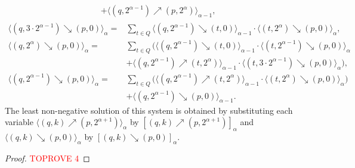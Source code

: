 \documentclass[a4paper,UKenglish,cleveref,autoref,thm-restate,colorlinks]{lipics-v2021}
\newcommand{\ocStateSpace}{Q}
\newcommand{\ocState}{q}
\newcommand{\ocStateB}{p}
\newcommand{\ocStateC}{t}
\newcommand{\ocCount}{k}
\newcommand{\powerIndex}{\alpha}
\newcommand{\upProba}[5]{[(#1,#2)\nearrow{}(#3,#4)]_{#5}}
\newcommand{\downProba}[5]{[(#1,#2)\searrow{}(#3,#4)]_{#5}}
\newcommand{\upProbaVar}[5]{\langle (#1,#2)\nearrow{}(#3,#4)\rangle_{#5}}
\newcommand{\downProbaVar}[5]{\langle (#1,#2)\searrow{}(#3,#4)\rangle_{#5}}
\begin{document}
\begin{theorem}
\begin{align}
\begin{split}
      &
      + \upProbaVar{\ocState}{2^{\powerIndex-1}}{\ocStateB}{2^{\powerIndex}}{\powerIndex-1},
    \end{split}\label{equation:transitions:up:third}
  \end{align}
  \begin{align*}
    \downProbaVar{\ocState}{3\cdot 2^{\powerIndex-1}}{\ocStateB}{0}{\powerIndex} =
    & 
      \sum_{\ocStateC\in\ocStateSpace}
      \downProbaVar{\ocState}{2^{\powerIndex-1}}{\ocStateC}{0}{\powerIndex-1}
      \cdot
      \downProbaVar{\ocStateC}{2^{\powerIndex}}{\ocStateB}{0}{\powerIndex}, \\
    \downProbaVar{\ocState}{2^{\powerIndex}}{\ocStateB}{0}{\powerIndex} =
    &
      \sum_{\ocStateC\in\ocStateSpace}\bigg(
      \downProbaVar{\ocState}{2^{\powerIndex-1}}{\ocStateC}{0}{\powerIndex-1}
      \cdot 
      \downProbaVar{\ocStateC}{2^{\powerIndex-1}}{\ocStateB}{0}{\powerIndex} \\
    &
      +
      \upProbaVar{\ocState}{2^{\powerIndex-1}}{\ocStateC}{2^{\powerIndex}}{\powerIndex-1}
      \cdot 
      \downProbaVar{\ocStateC}{3\cdot 2^{\powerIndex-1}}{\ocStateB}{0}{\powerIndex}
      \bigg), \\
    \downProbaVar{\ocState}{2^{\powerIndex-1}}{\ocStateB}{0}{\powerIndex} =
    &
      \sum_{\ocStateC\in\ocStateSpace}\bigg(
      \upProbaVar{\ocState}{2^{\powerIndex-1}}{\ocStateC}{2^{\powerIndex}}{\powerIndex-1}
      \cdot
      \downProbaVar{\ocStateC}{2^{\powerIndex}}{\ocStateB}{0}{\powerIndex}
      \bigg) \\
    &
      + \downProbaVar{\ocState}{2^{\powerIndex-1}}{\ocStateB}{0}{\powerIndex-1}.
  \end{align*}
  The least non-negative solution of this system is obtained by substituting each variable $\upProbaVar{\ocState}{\ocCount}{\ocStateB}{2^{\powerIndex+1}}{\powerIndex}$ by $\upProba{\ocState}{\ocCount}{\ocStateB}{2^{\powerIndex+1}}{\powerIndex}$ and $\downProbaVar{\ocState}{\ocCount}{\ocStateB}{0}{\powerIndex}$ by $\downProba{\ocState}{\ocCount}{\ocStateB}{0}{\powerIndex}$.
\end{theorem}

\begin{proof}\textcolor{red}{TOPROVE 4}\end{proof}
\end{document}
